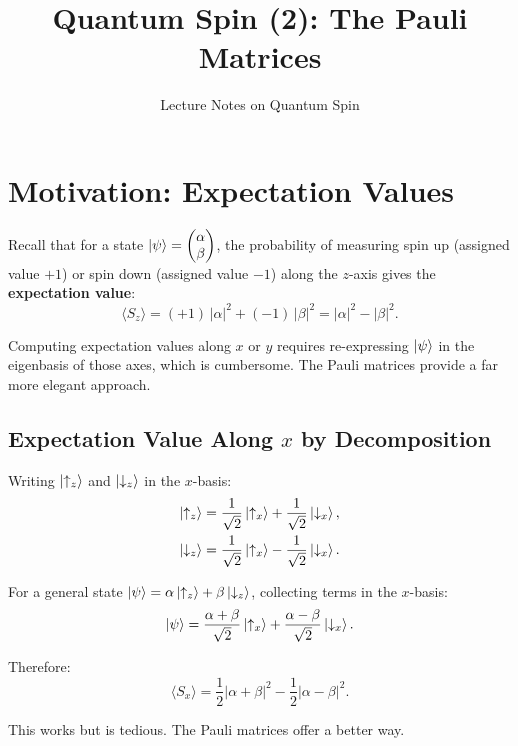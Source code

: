 \documentclass[11pt,a4paper]{article}
\title{\textbf{Quantum Spin (2): The Pauli Matrices}}
\author{Lecture Notes on Quantum Spin}
\date{}
\theoremstyle{definition}
\theoremstyle{plain}
\theoremstyle{remark}
\begin{document}
\maketitle
\tableofcontents
\newpage

\section{Motivation: Expectation Values}

Recall that for a state $\ket{\psi} = \begin{pmatrix} \alpha \\ \beta \end{pmatrix}$, the probability of measuring spin up (assigned value $+1$) or spin down (assigned value $-1$) along the $z$-axis gives the \textbf{expectation value}:
\[
    \langle S_z \rangle = (+1)\,|\alpha|^2 + (-1)\,|\beta|^2 = |\alpha|^2 - |\beta|^2.
\]

Computing expectation values along $x$ or $y$ requires re-expressing $\ket{\psi}$ in the eigenbasis of those axes, which is cumbersome. The Pauli matrices provide a far more elegant approach.

\subsection{Expectation Value Along $x$ by Decomposition}

Writing $\ket{\uparrow_z}$ and $\ket{\downarrow_z}$ in the $x$-basis:
\begin{align}
    \ket{\uparrow_z} &= \frac{1}{\sqrt{2}}\ket{\uparrow_x} + \frac{1}{\sqrt{2}}\ket{\downarrow_x}, \\
    \ket{\downarrow_z} &= \frac{1}{\sqrt{2}}\ket{\uparrow_x} - \frac{1}{\sqrt{2}}\ket{\downarrow_x}.
\end{align}

For a general state $\ket{\psi} = \alpha\ket{\uparrow_z} + \beta\ket{\downarrow_z}$, collecting terms in the $x$-basis:
\[
    \ket{\psi} = \frac{\alpha + \beta}{\sqrt{2}}\ket{\uparrow_x} + \frac{\alpha - \beta}{\sqrt{2}}\ket{\downarrow_x}.
\]

Therefore:
\[
    \langle S_x \rangle = \frac{1}{2}|\alpha + \beta|^2 - \frac{1}{2}|\alpha - \beta|^2.
\]

This works but is tedious. The Pauli matrices offer a better way.

\end{document}
